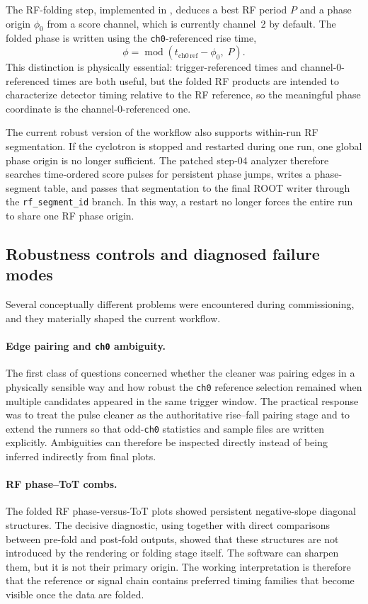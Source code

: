 The RF-folding step, implemented in , deduces a best RF period $P$ and a phase origin $\phi_0$ from a score channel, which is currently channel~2 by default. The folded phase is written using the \texttt{ch0}-referenced rise time,
\begin{equation}
\phi = \operatorname{mod}\!\left( t_{\mathrm{ch0\,ref}} - \phi_0,\; P \right).
\end{equation}
This distinction is physically essential: trigger-referenced times and channel-0-referenced times are both useful, but the folded RF products are intended to characterize detector timing relative to the RF reference, so the meaningful phase coordinate is the channel-0-referenced one.

The current robust version of the workflow also supports within-run RF segmentation. If the cyclotron is stopped and restarted during one run, one global phase origin is no longer sufficient. The patched step-04 analyzer therefore searches time-ordered score pulses for persistent phase jumps, writes a phase-segment table, and passes that segmentation to the final ROOT writer through the \texttt{rf\_segment\_id} branch. In this way, a restart no longer forces the entire run to share one RF phase origin.

\subsection{Robustness controls and diagnosed failure modes}

Several conceptually different problems were encountered during commissioning, and they materially shaped the current workflow.

\paragraph{Edge pairing and \texttt{ch0} ambiguity.}
The first class of questions concerned whether the cleaner was pairing edges in a physically sensible way and how robust the \texttt{ch0} reference selection remained when multiple candidates appeared in the same trigger window. The practical response was to treat the pulse cleaner as the authoritative rise--fall pairing stage and to extend the runners so that odd-\texttt{ch0} statistics and sample files are written explicitly. Ambiguities can therefore be inspected directly instead of being inferred indirectly from final plots.

\paragraph{RF phase--ToT combs.}
The folded RF phase-versus-ToT plots showed persistent negative-slope diagonal structures. The decisive diagnostic, using  together with direct comparisons between pre-fold and post-fold outputs, showed that these structures are not introduced by the rendering or folding stage itself. The software can sharpen them, but it is not their primary origin. The working interpretation is therefore that the reference or signal chain contains preferred timing families that become visible once the data are folded.

